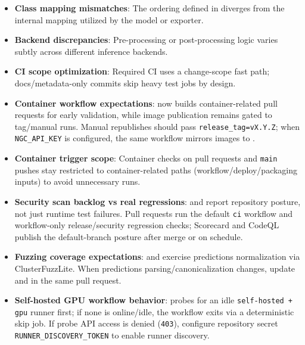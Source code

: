 \begin{itemize}
  \item \textbf{Class mapping mismatches}: The ordering defined in  diverges from the internal mapping utilized by the model or exporter.
  \item \textbf{Backend discrepancies}: Pre-processing or post-processing logic varies subtly across different inference backends.
  \item \textbf{CI scope optimization}: Required CI uses a change-scope fast path; docs/metadata-only commits skip heavy test jobs by design.
  \item \textbf{Container workflow expectations}:  now builds container-related pull requests for early validation, while image publication remains gated to tag/manual runs. Manual republishes should pass \texttt{release\_tag=vX.Y.Z}; when \texttt{NGC\_API\_KEY} is configured, the same workflow mirrors images to .
  \item \textbf{Container trigger scope}: Container checks on pull requests and \texttt{main} pushes stay restricted to container-related paths (workflow/deploy/packaging inputs) to avoid unnecessary runs.
  \item \textbf{Security scan backlog vs real regressions}:  and  report repository posture, not just runtime test failures. Pull requests run the default \texttt{ci} workflow and workflow-only release/security regression checks; Scorecard and CodeQL publish the default-branch posture after merge or on schedule.
  \item \textbf{Fuzzing coverage expectations}:  and  exercise predictions normalization via ClusterFuzzLite. When predictions parsing/canonicalization changes, update  and  in the same pull request.
  \item \textbf{Self-hosted GPU workflow behavior}:  probes for an idle \texttt{self-hosted + gpu} runner first; if none is online/idle, the workflow exits via a deterministic skip job. If probe API access is denied (\texttt{403}), configure repository secret \texttt{RUNNER\_DISCOVERY\_TOKEN} to enable runner discovery.
\end{itemize}

